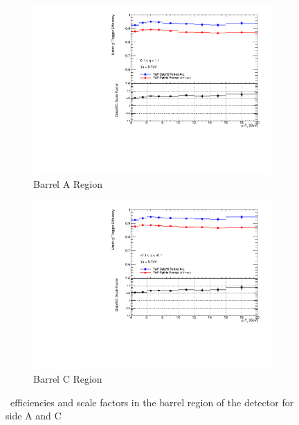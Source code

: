 \begin{figure}[tbhp]
  \centering
  \begin{subfigure}[b]{0.85\textwidth}
    \includegraphics[width=\textwidth]{PartCalibration2012/Plots/SFPlots/Barrel_A_smt.pdf}
    \caption{Barrel A Region} \label{fig:CalibrationScaleFactorBarrelA}
  \end{subfigure}
  
  \begin{subfigure}[b]{0.85\textwidth}
    \includegraphics[width=\textwidth]{PartCalibration2012/Plots/SFPlots/Barrel_C_smt.pdf}
    \caption{Barrel C Region} \label{fig:CalibrationScaleFactorBarrelC}
  \end{subfigure}
  \caption{\xsm\ efficiencies and scale factors in the barrel region of the detector for side  A and  C} \label{fig:CalibrationScaleFactorBarrel}
\end{figure}

